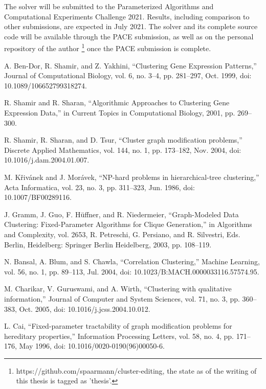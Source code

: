 \documentclass[12pt,oneside,english,parskip=full,headings=small]{scrbook}
\theoremstyle{definition}
\begin{document}
The solver will be submitted to the Parameterized Algorithms and Computational Experiments Challenge
2021. Results, including comparison to other submissions, are expected in July 2021. The solver and
its complete source code will be available through the PACE submission, as well as on the personal
repository of the author \footnote{https://github.com/spaarmann/cluster-editing, the state as of the
writing of this thesis is tagged as 'thesis'.} once the PACE submission is complete.

\begin{thebibliography}{99}

A. Ben-Dor, R. Shamir, and Z. Yakhini, “Clustering Gene Expression Patterns,” Journal of
Computational Biology, vol. 6, no. 3–4, pp. 281–297, Oct. 1999, doi: 10.1089/106652799318274.

R. Shamir and R. Sharan, “Algorithmic Approaches to Clustering Gene Expression Data,” in Current
Topics in Computational Biology, 2001, pp. 269–300.

R. Shamir, R. Sharan, and D. Tsur, “Cluster graph modification problems,” Discrete Applied
Mathematics, vol. 144, no. 1, pp. 173–182, Nov. 2004, doi: 10.1016/j.dam.2004.01.007.

M. Křivánek and J. Morávek, “NP-hard problems in hierarchical-tree clustering,” Acta Informatica,
vol. 23, no. 3, pp. 311–323, Jun. 1986, doi: 10.1007/BF00289116.

J. Gramm, J. Guo, F. Hüffner, and R. Niedermeier, “Graph-Modeled Data Clustering: Fixed-Parameter
Algorithms for Clique Generation,” in Algorithms and Complexity, vol. 2653, R. Petreschi, G.
Persiano, and R. Silvestri, Eds. Berlin, Heidelberg: Springer Berlin Heidelberg, 2003, pp. 108–119.

N. Bansal, A. Blum, and S. Chawla, “Correlation Clustering,” Machine Learning, vol. 56, no. 1,
pp. 89–113, Jul. 2004, doi: 10.1023/B:MACH.0000033116.57574.95.

M. Charikar, V. Guruswami, and A. Wirth, “Clustering with qualitative information,” Journal of
Computer and System Sciences, vol. 71, no. 3, pp. 360–383, Oct. 2005, doi:
10.1016/j.jcss.2004.10.012.

L. Cai, “Fixed-parameter tractability of graph modification problems for hereditary properties,”
Information Processing Letters, vol. 58, no. 4, pp. 171–176, May 1996, doi:
10.1016/0020-0190(96)00050-6.


\end{thebibliography}
\end{document}
